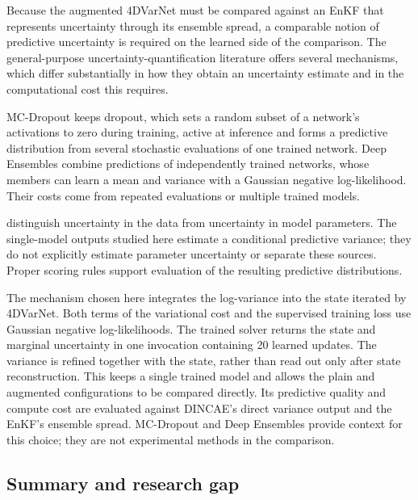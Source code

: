 \documentclass[english, 12pt, a4paper, elec, utf8, a-2b, online]{aaltothesis}
\begin{document}
Because the augmented 4DVarNet must be compared against
an EnKF that represents uncertainty through its ensemble
spread, a comparable notion of predictive uncertainty is required on
the learned side of the comparison. The general-purpose
uncertainty-quantification literature offers several mechanisms,
which differ substantially in how they obtain an uncertainty
estimate and in the computational cost this requires.

MC-Dropout \cite{gal2016mcdropout} keeps dropout, which sets a random subset of
a network's activations to zero during training, active at inference and
forms a predictive distribution from several stochastic evaluations of one
trained network. Deep Ensembles \cite{lakshminarayanan2017deepensembles}
combine predictions of independently trained networks, whose members can
learn a mean and variance with a Gaussian negative log-likelihood.
Their costs come from repeated evaluations or multiple trained models.

\citeauthor{kendall2017uncertainties} \cite{kendall2017uncertainties}
distinguish uncertainty in the data from uncertainty in model parameters.
The single-model outputs studied here estimate a conditional predictive
variance; they do not explicitly estimate parameter uncertainty or separate
these sources. Proper scoring rules \cite{gneiting2007scoring} support
evaluation of the resulting predictive distributions.

The mechanism chosen here integrates the log-variance into the state iterated
by 4DVarNet. Both terms of the variational cost and the supervised training
loss use Gaussian negative log-likelihoods. The trained solver returns the
state and marginal uncertainty in one invocation containing 20 learned
updates. The variance is refined together with the state, rather than read out
only after state reconstruction. This keeps a single trained model and
allows the plain and augmented configurations to be compared directly. Its predictive
quality and compute cost are evaluated against DINCAE's direct variance
output and the EnKF's ensemble spread. MC-Dropout and Deep Ensembles provide
context for this choice; they are not experimental methods in the comparison.

\subsection{Summary and research gap}
\end{document}

